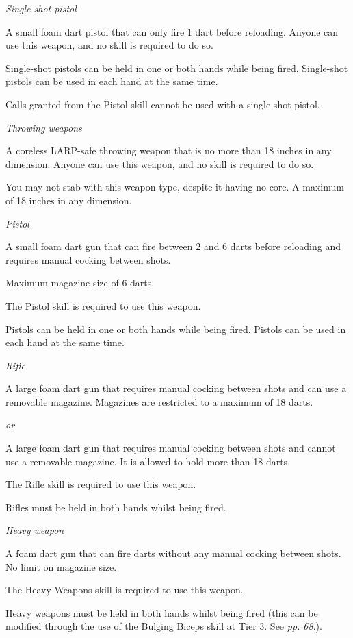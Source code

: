 \textit{Single-shot pistol}

A small foam dart pistol that can only fire 1 dart before reloading. Anyone can use this weapon, and no skill is required to do so.

Single-shot pistols can be held in one or both hands while being fired. Single-shot pistols can be used in each hand at the same time.

Calls granted from the Pistol skill cannot be used with a single-shot pistol.

\textit{Throwing weapons}

A coreless LARP-safe throwing weapon that is no more than 18 inches in any dimension. Anyone can use this weapon, and no skill is required to do so.

You may not stab with this weapon type, despite it having no core. A maximum of 18 inches in any dimension.

\textit{Pistol}

A small foam dart gun that can fire between 2 and 6 darts before reloading and requires manual cocking between shots.

Maximum magazine size of 6 darts.

The Pistol skill is required to use this weapon.

Pistols can be held in one or both hands while being fired. Pistols can be used in each hand at the same time.

\textit{Rifle}

A large foam dart gun that requires manual cocking between shots and can use a removable magazine. Magazines are restricted to a maximum of 18 darts.

\textit{or}

A large foam dart gun that requires manual cocking between shots and cannot use a removable magazine. It is allowed to hold more than 18 darts.

The Rifle skill is required to use this weapon.

Rifles must be held in both hands whilst being fired.

\textit{Heavy weapon}

A foam dart gun that can fire darts without any manual cocking between shots. No limit on magazine size.

The Heavy Weapons skill is required to use this weapon.

Heavy weapons must be held in both hands whilst being fired (this can be modified through the use of the Bulging Biceps skill at Tier 3. See \textit{pp. 68}.).

